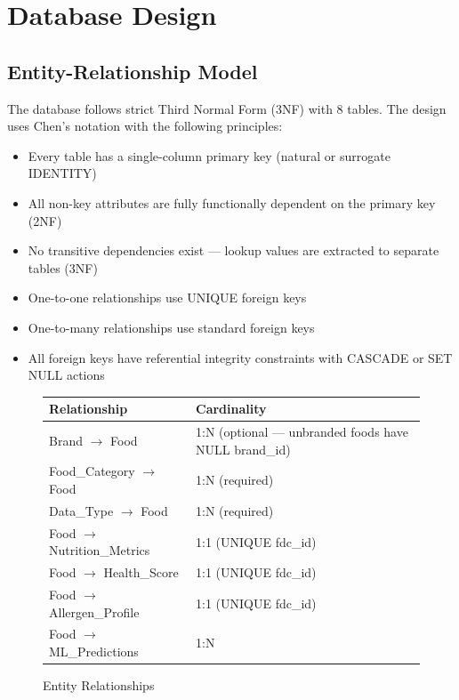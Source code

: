 \documentclass[12pt,a4paper]{article}
\begin{document}
\section{Database Design}

\subsection{Entity-Relationship Model}

The database follows strict Third Normal Form (3NF) with 8 tables. The design uses Chen's notation with the following principles:
\begin{itemize}[nosep]
    \item Every table has a single-column primary key (natural or surrogate IDENTITY)
    \item All non-key attributes are fully functionally dependent on the primary key (2NF)
    \item No transitive dependencies exist — lookup values are extracted to separate tables (3NF)
    \item One-to-one relationships use UNIQUE foreign keys
    \item One-to-many relationships use standard foreign keys
    \item All foreign keys have referential integrity constraints with CASCADE or SET NULL actions
\end{itemize}

\begin{figure}[h]
\centering
\begin{tabular}{ll}
\toprule
\textbf{Relationship} & \textbf{Cardinality} \\
\midrule
Brand $\rightarrow$ Food    & 1:N (optional — unbranded foods have NULL brand\_id) \\
Food\_Category $\rightarrow$ Food & 1:N (required) \\
Data\_Type $\rightarrow$ Food     & 1:N (required) \\
Food $\rightarrow$ Nutrition\_Metrics & 1:1 (UNIQUE fdc\_id) \\
Food $\rightarrow$ Health\_Score      & 1:1 (UNIQUE fdc\_id) \\
Food $\rightarrow$ Allergen\_Profile  & 1:1 (UNIQUE fdc\_id) \\
Food $\rightarrow$ ML\_Predictions    & 1:N \\
\bottomrule
\end{tabular}
\caption{Entity Relationships}
\end{figure}
\end{document}
